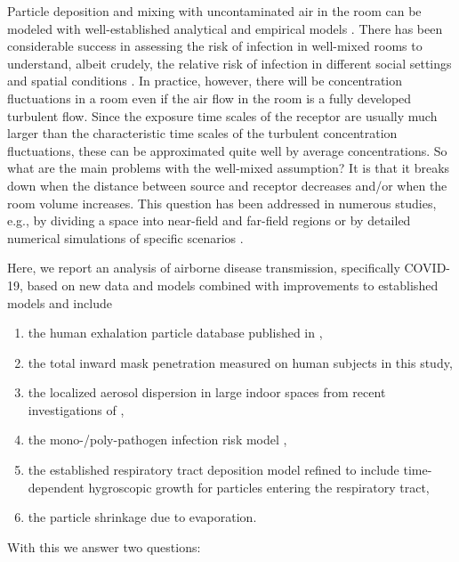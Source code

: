 \documentclass[preprint]{elsarticle}
\begin{document}
Particle deposition and mixing with uncontaminated air in the room can be modeled with well-established analytical and empirical models \cite[e.g. see][and references therein]{riley2002indoor, Nazaroff_1998, Nicas_2005, Lai_2000, He_2005, Nazaroff2008}.  There has been considerable success in assessing the risk of infection in well-mixed rooms to understand, albeit crudely, the relative risk of infection in different social settings and spatial conditions \cite{BUONANNO_2020, Miller_2020, Nordsiek2021, Bazant2021}. In practice, however, there will be concentration fluctuations in a room even if the air flow in the room is a fully developed turbulent flow. Since the exposure time scales of the receptor are usually much larger than the characteristic time scales of the turbulent concentration fluctuations, these can be approximated quite well by average concentrations. So what are the main problems with the well-mixed assumption?  It is that it breaks down when the distance between source and receptor decreases and/or when the room volume increases. This question has been addressed in numerous studies, e.g., by dividing a space into near-field and far-field regions \cite{Cherrie_2011, Nicas_2008, Arnold_2017} or by detailed numerical simulations of specific scenarios \cite{Sajjadi2016,Gao2008,Zhao2009}.

Here, we report an analysis of airborne disease transmission, specifically COVID-19, based on new data and models combined with improvements to established models and include 
\begin{enumerate}[topsep=1ex,itemsep=-1ex,partopsep=1ex,parsep=1ex]
\item{ the human exhalation particle database published in \cite{heads},} 
\item{ the total inward mask penetration measured on human subjects in this study,} 
\item{ the localized aerosol dispersion in large indoor spaces from recent investigations of \cite{Hejazi2021},}
\item{ the mono-/poly-pathogen infection risk model \cite{Nordsiek2021},} 
\item{ the established respiratory tract deposition model \cite{ICRP1994} refined to include time-dependent hygroscopic growth for particles entering the respiratory tract,}
\item {the particle shrinkage due to evaporation.} 
\end{enumerate}

\noindent With this we answer two questions:
\end{document}
